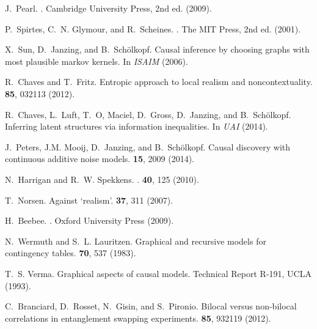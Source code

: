 \documentclass[12pt,onecolumn,nofootinbib]{revtex4-2}
\begin{document}
%
%

\begin{thebibliography}{10}

J.~Pearl.
.
\newblock Cambridge University Press, 2nd ed. (2009).

P.~Spirtes, C.~N. Glymour, and R.~Scheines.
.
\newblock The MIT Press, 2nd ed. (2001).

X.~Sun, D.~Janzing, and B.~Sch{\"o}lkopf.
\newblock Causal inference by choosing graphs with most plausible markov
  kernels.
\newblock In {\em ISAIM} (2006).

R.~Chaves and T.~Fritz.
\newblock Entropic approach to local realism and noncontextuality.
 \textbf{85}, 032113 (2012).

R.~Chaves, L.~Luft, T.~O, Maciel, D.~Gross, D.~Janzing, and B.~Sch{\"o}lkopf.
\newblock Inferring latent structures via information inequalities.
\newblock In {\em UAI} (2014).

J.~Peters, J.M. Mooij, D.~Janzing, and B.~Sch\"{o}lkopf.
\newblock Causal discovery with continuous additive noise models.
 \textbf{15}, 2009 (2014).

N.~Harrigan and R.~W. Spekkens.
.
 \textbf{40}, 125 (2010).

T.~Norsen.
\newblock Against `realism'.
 \textbf{37}, 311 (2007).

H.~Beebee.
.
\newblock Oxford University Press (2009).

N.~Wermuth and S.~L. Lauritzen.
\newblock Graphical and recursive models for contingency tables.
 \textbf{70}, 537 (1983).

T.~S. Verma.
\newblock Graphical aspects of causal models.
\newblock Technical Report R-191, UCLA (1993).

C.~Branciard, D.~Rosset, N.~Gisin, and S.~Pironio.
\newblock Bilocal versus non-bilocal correlations in entanglement swapping
  experiments.
 \textbf{85}, 932119 (2012).


\end{thebibliography}
\end{document}
